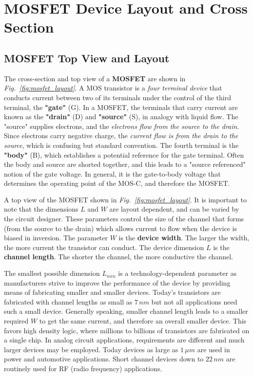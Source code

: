 \section{MOSFET Device Layout and Cross Section}
\subsection{MOSFET Top View and Layout}
The cross-section and top view of a \textbf{MOSFET} are shown in \emph{Fig.~\ref{fig:mosfet_layout}}.  A MOS transistor is a \textit{four terminal device} that conducts current between two of its terminals under the control of the third terminal, the \textbf{"gate"} (G).  In a MOSFET, the terminals that carry current are known as the \textbf{"drain"} (D) and \textbf{"source"} (S), in analogy with liquid flow.  The "source" supplies electrons, and the \textit{electrons flow from the source to the drain}.  Since electrons carry negative charge, the \textit{current flow is from the drain to the source}, which is confusing but standard convention.  The fourth terminal is the \textbf{"body"} (B), which establishes a potential reference for the gate terminal.  Often the body and source are shorted together, and this leads to a "source referenced" notion of the gate voltage.  In general, it is the gate-to-body voltage that determines the operating point of the MOS-C, and therefore the MOSFET.

A top view of the MOSFET shown in \emph{Fig.~\ref{fig:mosfet_layout}}.  It is important to note that the dimensions $L$ and $W$ are layout dependent, and can be varied by the circuit designer.  These parameters control the size of the channel that forms (from the source to the drain) which allows current to flow when the device is biased in inversion.  The parameter $W$ is the \textbf{device width}.  The larger the width, the more current the transistor can conduct.  The device dimension $L$ is the \textbf{channel length}. The shorter the channel, the more conductive the channel.

The smallest possible dimension $L_{min}$ is a technology-dependent parameter as manufacturers strive to improve the performance of the device by providing means of fabricating smaller and smaller devices.  Today's transistors are fabricated with channel lengths as small as $7\,nm$ but not all applications need such a small device.  Generally speaking, smaller channel length leads to a smaller required $W$ to get the same current, and therefore an overall smaller device.  This favors high density logic, where millions to billions of transistors are fabricated on a single chip.  In analog circuit applications, requirements are different and much larger devices may be employed.  Today devices as large as $1\,\mu m$ are used in power and automotive applications.  Short channel devices down to $22\,nm$ are routinely used for RF (radio frequency) applications.


